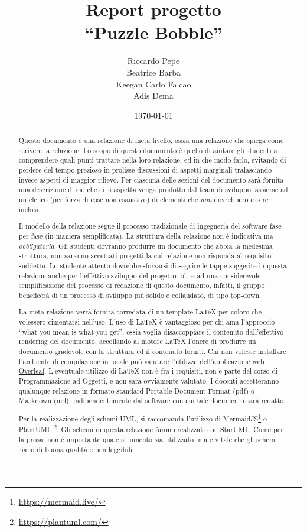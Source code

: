 \documentclass[a4paper,12pt]{report}
\title{Report progetto\\``Puzzle Bobble''}
\author{Riccardo Pepe\\
		Beatrice Barba\\
		Keegan Carlo Falcao\\
		Adis Dema}
\date{\today}
\begin{document}
\maketitle

\begin{abstract}
Questo documento è una relazione di meta livello, ossia una relazione che spiega come scrivere la relazione.
%
Lo scopo di questo documento è quello di aiutare gli studenti a comprendere quali punti trattare nella loro relazione, ed in che modo farlo, evitando di perdere del tempo prezioso in prolisse discussioni di aspetti marginali tralasciando invece aspetti di maggior rilievo.
%
Per ciascuna delle sezioni del documento sarà fornita una descrizione di ciò che ci si aspetta venga prodotto dal team di sviluppo, assieme ad un elenco (per forza di cose non esaustivo) di elementi che \emph{non} dovrebbero essere inclusi.

Il modello della relazione segue il processo tradizionale di ingegneria del software fase per fase (in maniera semplificata).
%
La struttura della relazione non è indicativa ma \textit{obbligatoria}.
%
Gli studenti dovranno produrre un documento che abbia la medesima struttura, non saranno accettati progetti la cui relazione non risponda al requisito suddetto.
%
Lo studente attento dovrebbe sforzarsi di seguire le tappe suggerite in questa relazione anche per l'effettivo sviluppo del progetto: oltre ad una considerevole semplificazione del processo di redazione di questo documento, infatti, il gruppo beneficerà di un processo di sviluppo più solido e collaudato, di tipo top-down.

La meta-relazione verrà fornita corredata di un template \LaTeX{} per coloro che volessero cimentarsi nell'uso.
%
L'uso di \LaTeX{} è vantaggioso per chi ama l'approccio ``what you mean is what you get'', ossia voglia disaccoppiare il contenuto dall'effettivo rendering del documento, accollando al motore \LaTeX{} l'onere di produrre un documento gradevole con la struttura ed il contenuto forniti.
%
Chi non volesse installare l'ambiente di compilazione in locale può valutare l'utilizzo dell'applicazione web \href{https://www.overleaf.com/}{Overleaf}.
%
L'eventuale utilizzo di \LaTeX{} non è fra i requisiti,
non è parte del corso di Programmazione ad Oggetti, e non sarà ovviamente valutato.
%
I docenti accetteranno qualunque relazione in formato standard Portable Document Format (pdf) o Markdown (md), indipendentemente dal software con cui tale documento sarà redatto.

Per la realizzazione degli schemi UML, si raccomanda l'utilizzo di MermaidJS\footnote{\url{https://mermaid.live/}} o PlantUML \footnote{\url{https://plantuml.com/}}.
%
Gli schemi in questa relazione furono realizzati con StarUML.
%
Come per la prosa, non è importante quale strumento sia utilizzato, ma è vitale che gli schemi siano di buona qualità e ben leggibili.

\end{abstract}
\end{document}
